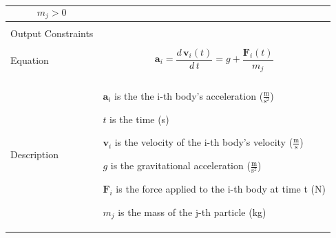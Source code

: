 \documentclass[12pt]{article}
\begin{document}
\begin{minipage}{\textwidth}
\begin{tabular}{p{} p{}}
\begin{displaymath}
                                             {m_{j}}>0
                                             \end{displaymath}
                                             \\ \midrule \\
                                             Output Constraints & \\ \midrule \\
                                                                  Equation & \begin{displaymath}
                                                                             {\mathbf{a}_{i}}=\frac{d\,{\mathbf{v}_{i}}\left(t\right)}{d\,t}=g+\frac{{\mathbf{F}_{i}}\left(t\right)}{{m_{j}}}
                                                                             \end{displaymath}
                                                                             \\ \midrule \\
                                                                             Description & \begin{symbDescription}
                                                                                           \item{${\mathbf{a}_{i}}$ is the the i-th body's acceleration ($\frac{\text{m}}{\text{s}^{2}}$)}
                                                                                           \item{$t$ is the time (s)}
                                                                                           \item{${\mathbf{v}_{i}}$ is the velocity of the i-th body's velocity ($\frac{\text{m}}{\text{s}}$)}
                                                                                           \item{$g$ is the gravitational acceleration ($\frac{\text{m}}{\text{s}^{2}}$)}
                                                                                           \item{${\mathbf{F}_{i}}$ is the force applied to the i-th body at time t (N)}
                                                                                           \item{${m_{j}}$ is the mass of the j-th particle (kg)}
                                                                                           \end{symbDescription}

\end{tabular}
\end{minipage}
\end{document}
